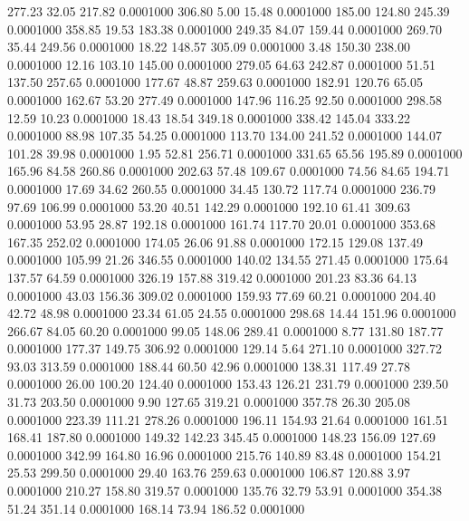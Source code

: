  277.23   32.05  217.82   0.0001000
 306.80    5.00   15.48   0.0001000
 185.00  124.80  245.39   0.0001000
 358.85   19.53  183.38   0.0001000
 249.35   84.07  159.44   0.0001000
 269.70   35.44  249.56   0.0001000
  18.22  148.57  305.09   0.0001000
   3.48  150.30  238.00   0.0001000
  12.16  103.10  145.00   0.0001000
 279.05   64.63  242.87   0.0001000
  51.51  137.50  257.65   0.0001000
 177.67   48.87  259.63   0.0001000
 182.91  120.76   65.05   0.0001000
 162.67   53.20  277.49   0.0001000
 147.96  116.25   92.50   0.0001000
 298.58   12.59   10.23   0.0001000
  18.43   18.54  349.18   0.0001000
 338.42  145.04  333.22   0.0001000
  88.98  107.35   54.25   0.0001000
 113.70  134.00  241.52   0.0001000
 144.07  101.28   39.98   0.0001000
   1.95   52.81  256.71   0.0001000
 331.65   65.56  195.89   0.0001000
 165.96   84.58  260.86   0.0001000
 202.63   57.48  109.67   0.0001000
  74.56   84.65  194.71   0.0001000
  17.69   34.62  260.55   0.0001000
  34.45  130.72  117.74   0.0001000
 236.79   97.69  106.99   0.0001000
  53.20   40.51  142.29   0.0001000
 192.10   61.41  309.63   0.0001000
  53.95   28.87  192.18   0.0001000
 161.74  117.70   20.01   0.0001000
 353.68  167.35  252.02   0.0001000
 174.05   26.06   91.88   0.0001000
 172.15  129.08  137.49   0.0001000
 105.99   21.26  346.55   0.0001000
 140.02  134.55  271.45   0.0001000
 175.64  137.57   64.59   0.0001000
 326.19  157.88  319.42   0.0001000
 201.23   83.36   64.13   0.0001000
  43.03  156.36  309.02   0.0001000
 159.93   77.69   60.21   0.0001000
 204.40   42.72   48.98   0.0001000
  23.34   61.05   24.55   0.0001000
 298.68   14.44  151.96   0.0001000
 266.67   84.05   60.20   0.0001000
  99.05  148.06  289.41   0.0001000
   8.77  131.80  187.77   0.0001000
 177.37  149.75  306.92   0.0001000
 129.14    5.64  271.10   0.0001000
 327.72   93.03  313.59   0.0001000
 188.44   60.50   42.96   0.0001000
 138.31  117.49   27.78   0.0001000
  26.00  100.20  124.40   0.0001000
 153.43  126.21  231.79   0.0001000
 239.50   31.73  203.50   0.0001000
   9.90  127.65  319.21   0.0001000
 357.78   26.30  205.08   0.0001000
 223.39  111.21  278.26   0.0001000
 196.11  154.93   21.64   0.0001000
 161.51  168.41  187.80   0.0001000
 149.32  142.23  345.45   0.0001000
 148.23  156.09  127.69   0.0001000
 342.99  164.80   16.96   0.0001000
 215.76  140.89   83.48   0.0001000
 154.21   25.53  299.50   0.0001000
  29.40  163.76  259.63   0.0001000
 106.87  120.88    3.97   0.0001000
 210.27  158.80  319.57   0.0001000
 135.76   32.79   53.91   0.0001000
 354.38   51.24  351.14   0.0001000
 168.14   73.94  186.52   0.0001000
